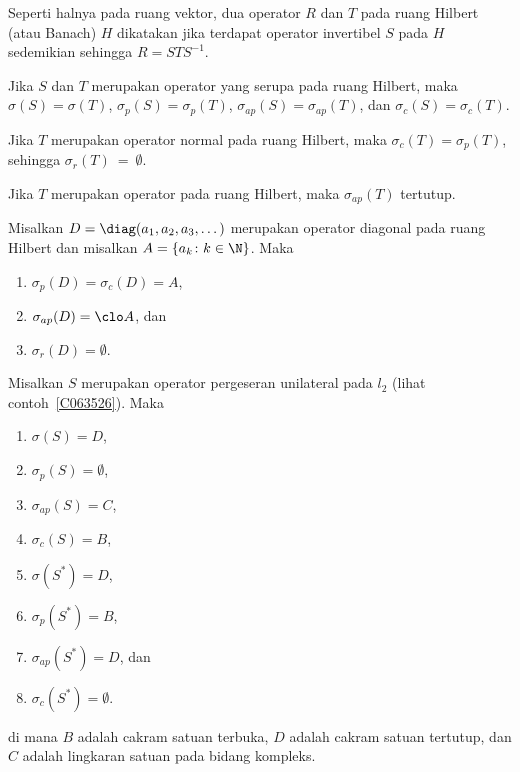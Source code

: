 
\begin{defn}\label{defn_similar_Hsp_ops} Seperti halnya pada ruang vektor, dua operator $R$ dan $T$ pada ruang Hilbert (atau Banach) $H$ dikatakan
 jika terdapat operator invertibel $S$ pada $H$ sedemikian sehingga $R = STS^{-1}$.
\end{defn}

\begin{prop} Jika $S$ dan $T$ merupakan operator yang serupa pada ruang Hilbert, maka $\sigma(S) = \sigma(T)$, $\sigma_p(S) = \sigma_p(T)$,
$\sigma_{ap}(S) = \sigma_{ap}(T)$, dan $\sigma_c(S) = \sigma_c(T)$.
\end{prop}

\begin{prop} Jika $T$ merupakan operator normal pada ruang Hilbert, maka $\sigma_c(T) = \sigma_p(T)$, sehingga $\sigma_r(T)~=~\emptyset$.
\end{prop}

\begin{prop} Jika $T$ merupakan operator pada ruang Hilbert, maka $\sigma_{ap}(T)$ tertutup.
\end{prop}

\begin{exam} Misalkan $D = \diag(a_1,a_2,a_3,\dots)$ merupakan operator diagonal pada ruang Hilbert dan misalkan
$A = \{a_k\colon k\in\N\}$. Maka
   \begin{enumerate}[label=(\alph*)]
     \item $\sigma_p(D) = \sigma_c(D) = A$,
     \item $\sigma_{ap}(D) = \clo A$, dan
     \item $\sigma_r(D) = \emptyset$.
   \end{enumerate}
\end{exam}

\begin{exam} Misalkan $S$ merupakan operator pergeseran unilateral pada $l_2$
(lihat contoh~\ref{C063526}). Maka
    \begin{enumerate}[label=(\alph*)]
      \item $\sigma(S) = D$,
      \item $\sigma_p(S) = \emptyset$,
      \item $\sigma_{ap}(S) = C$,
      \item $\sigma_c(S) = B$,
      \item $\sigma(S^*) = D$,
      \item $\sigma_p(S^*) = B$,
      \item $\sigma_{ap}(S^*) = D$, dan
      \item $\sigma_c(S^*) = \emptyset$.
    \end{enumerate}
di mana $B$ adalah cakram satuan terbuka, $D$ adalah cakram satuan tertutup, dan $C$ adalah lingkaran satuan pada bidang kompleks.
\end{exam}

